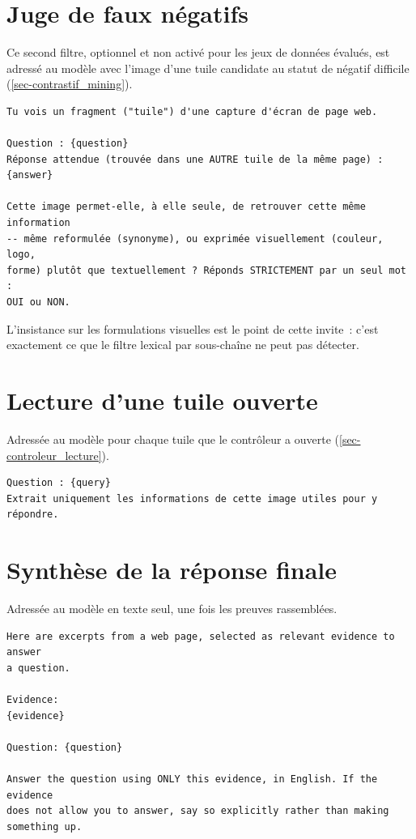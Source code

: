 \section{Juge de faux négatifs}

Ce second filtre, optionnel et non activé pour les jeux de données évalués, est
adressé au modèle avec l'image d'une tuile candidate au statut de négatif
difficile (\cref{sec-contrastif_mining}).

\begin{lstlisting}[language={}, frame=single, basicstyle=\ttfamily\scriptsize]
Tu vois un fragment ("tuile") d'une capture d'écran de page web.

Question : {question}
Réponse attendue (trouvée dans une AUTRE tuile de la même page) : {answer}

Cette image permet-elle, à elle seule, de retrouver cette même information
-- même reformulée (synonyme), ou exprimée visuellement (couleur, logo,
forme) plutôt que textuellement ? Réponds STRICTEMENT par un seul mot :
OUI ou NON.
\end{lstlisting}

L'insistance sur les formulations visuelles est le point de cette invite~: c'est
exactement ce que le filtre lexical par sous-chaîne ne peut pas détecter.

\section{Lecture d'une tuile ouverte}

Adressée au modèle pour chaque tuile que le contrôleur a ouverte
(\cref{sec-controleur_lecture}).

\begin{lstlisting}[language={}, frame=single, basicstyle=\ttfamily\scriptsize]
Question : {query}
Extrait uniquement les informations de cette image utiles pour y répondre.
\end{lstlisting}

\section{Synthèse de la réponse finale}

Adressée au modèle en texte seul, une fois les preuves rassemblées.

\begin{lstlisting}[language={}, frame=single, basicstyle=\ttfamily\scriptsize]
Here are excerpts from a web page, selected as relevant evidence to answer
a question.

Evidence:
{evidence}

Question: {question}

Answer the question using ONLY this evidence, in English. If the evidence
does not allow you to answer, say so explicitly rather than making
something up.
\end{lstlisting}

